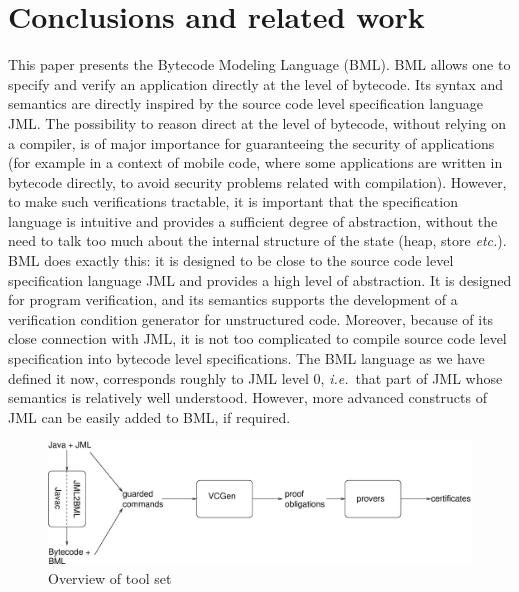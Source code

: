 \section{Conclusions and related work}\label{SecConcl}

This paper presents the Bytecode Modeling Language (BML). BML allows
one to specify and verify an application directly at the level of
bytecode. Its syntax and semantics are directly inspired by the source
code level specification language JML.  The possibility to reason
direct at the level of bytecode, without relying on a compiler, is of
major importance for guaranteeing the security of applications (for
example in a context of mobile code, where some applications are
written in bytecode directly, to avoid security problems related with
compilation). However, to make such verifications tractable, it is
important that the specification language is intuitive and provides a
sufficient degree of abstraction, without the need to talk too much
about the internal structure of the state (heap, store
\emph{etc.}). BML does exactly this: it is designed to be close to the
source code level specification language JML and provides a high level
of abstraction. It is designed for program verification, and its
semantics supports the development of a verification condition
generator for unstructured code. Moreover, because of its close
connection with JML, it is not too complicated to compile source code
level specification into bytecode level specifications.  The BML
language as we have defined it now, corresponds roughly to JML level
0, \emph{i.e.}\ that part of JML whose semantics is relatively well
understood. However, more advanced constructs of JML can be easily
added to BML, if required.

\begin{figure}[t]
\begin{center}
\includegraphics[width=\textwidth]{toolset.eps} 
\vspace*{-1em}
\caption{Overview of \mobius tool set}\label{FigToolSet}
\end{center}
\end{figure}
